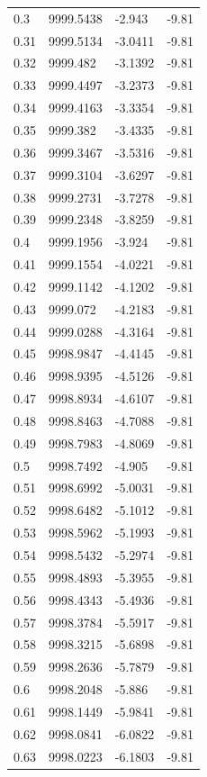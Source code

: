 \begin{table}[H]
\begin{tabular}{llll}
0.3 & 9999.5438 & -2.943 & -9.81 \\
0.31 & 9999.5134 & -3.0411 & -9.81 \\
0.32 & 9999.482 & -3.1392 & -9.81 \\
0.33 & 9999.4497 & -3.2373 & -9.81 \\
0.34 & 9999.4163 & -3.3354 & -9.81 \\
0.35 & 9999.382 & -3.4335 & -9.81 \\
0.36 & 9999.3467 & -3.5316 & -9.81 \\
0.37 & 9999.3104 & -3.6297 & -9.81 \\
0.38 & 9999.2731 & -3.7278 & -9.81 \\
0.39 & 9999.2348 & -3.8259 & -9.81 \\
0.4 & 9999.1956 & -3.924 & -9.81 \\
0.41 & 9999.1554 & -4.0221 & -9.81 \\
0.42 & 9999.1142 & -4.1202 & -9.81 \\
0.43 & 9999.072 & -4.2183 & -9.81 \\
0.44 & 9999.0288 & -4.3164 & -9.81 \\
0.45 & 9998.9847 & -4.4145 & -9.81 \\
0.46 & 9998.9395 & -4.5126 & -9.81 \\
0.47 & 9998.8934 & -4.6107 & -9.81 \\
0.48 & 9998.8463 & -4.7088 & -9.81 \\
0.49 & 9998.7983 & -4.8069 & -9.81 \\
0.5 & 9998.7492 & -4.905 & -9.81 \\
0.51 & 9998.6992 & -5.0031 & -9.81 \\
0.52 & 9998.6482 & -5.1012 & -9.81 \\
0.53 & 9998.5962 & -5.1993 & -9.81 \\
0.54 & 9998.5432 & -5.2974 & -9.81 \\
0.55 & 9998.4893 & -5.3955 & -9.81 \\
0.56 & 9998.4343 & -5.4936 & -9.81 \\
0.57 & 9998.3784 & -5.5917 & -9.81 \\
0.58 & 9998.3215 & -5.6898 & -9.81 \\
0.59 & 9998.2636 & -5.7879 & -9.81 \\
0.6 & 9998.2048 & -5.886 & -9.81 \\
0.61 & 9998.1449 & -5.9841 & -9.81 \\
0.62 & 9998.0841 & -6.0822 & -9.81 \\
0.63 & 9998.0223 & -6.1803 & -9.81 \\

\end{tabular}
\end{table}

